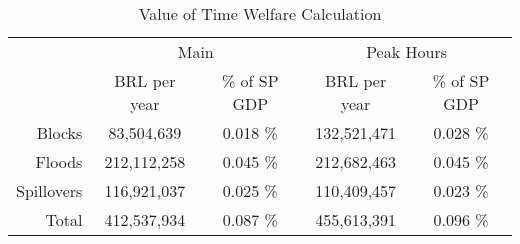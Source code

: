 \captionsetup{labelsep=newline}
\begin{table}[!htbp]
\centering

\caption{Value of Time Welfare Calculation}
\label{table:VOT-main}

  \begin{tabular}{r c c c c}
    \hline
    \hline
     & \multicolumn{2}{c}{Main} & \multicolumn{2}{c}{Peak Hours} \\
     & BRL per year & \% of SP GDP & BRL per year & \% of SP GDP\\
     \hline
     Blocks & 83,504,639 & 0.018 \% & 132,521,471 & 0.028 \% \\
     Floods & 212,112,258 & 0.045 \% & 212,682,463 & 0.045 \% \\
     Spillovers & 116,921,037 & 0.025 \% & 110,409,457 & 0.023 \% \\
     \hline
     Total & 412,537,934 & 0.087 \% & 455,613,391 & 0.096 \%\\
     \hline
     \hline
   \end{tabular}
\end{table}
